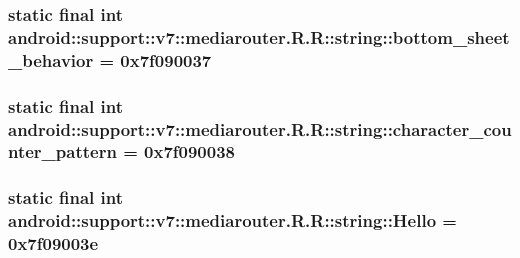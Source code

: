 \hypertarget{classandroid_1_1support_1_1v7_1_1mediarouter_1_1_r_1_1string_d23ecd7cf108b0c8149b8a5802d93c12}{
\subsubsection[{bottom\_\-sheet\_\-behavior}]{\setlength{\rightskip}{0pt plus 5cm}static final int android::support::v7::mediarouter.R.R::string::bottom\_\-sheet\_\-behavior = 0x7f090037}}
\label{classandroid_1_1support_1_1v7_1_1mediarouter_1_1_r_1_1string_d23ecd7cf108b0c8149b8a5802d93c12}


\hypertarget{classandroid_1_1support_1_1v7_1_1mediarouter_1_1_r_1_1string_72f471b4601ffc23cbdca8d612e49445}{
\subsubsection[{character\_\-counter\_\-pattern}]{\setlength{\rightskip}{0pt plus 5cm}static final int android::support::v7::mediarouter.R.R::string::character\_\-counter\_\-pattern = 0x7f090038}}
\label{classandroid_1_1support_1_1v7_1_1mediarouter_1_1_r_1_1string_72f471b4601ffc23cbdca8d612e49445}


\hypertarget{classandroid_1_1support_1_1v7_1_1mediarouter_1_1_r_1_1string_ee6398a912cd4e60d95780c240aa7730}{
\subsubsection[{Hello}]{\setlength{\rightskip}{0pt plus 5cm}static final int android::support::v7::mediarouter.R.R::string::Hello = 0x7f09003e}}
\label{classandroid_1_1support_1_1v7_1_1mediarouter_1_1_r_1_1string_ee6398a912cd4e60d95780c240aa7730}


